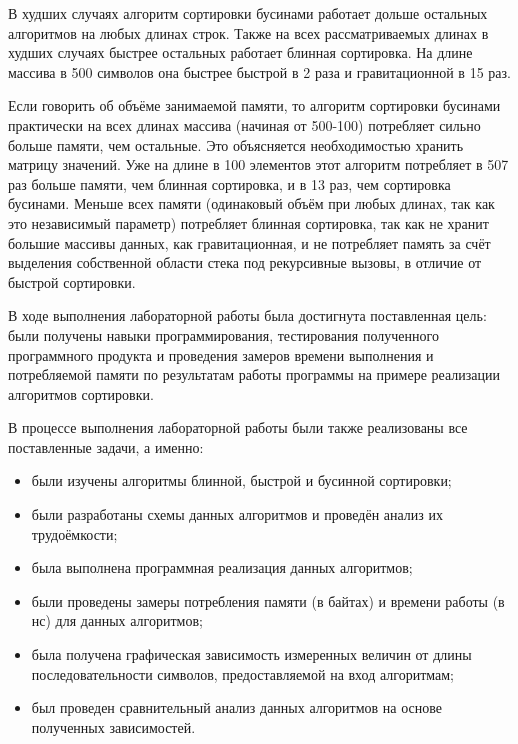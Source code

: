 В худших случаях алгоритм сортировки бусинами работает дольше остальных алгоритмов на любых длинах строк. Также на всех рассматриваемых длинах в худших случаях быстрее остальных работает блинная сортировка. На длине массива в 500 символов она быстрее быстрой в 2 раза и гравитационной в 15 раз.

Если говорить об объёме занимаемой памяти, то алгоритм сортировки бусинами практически на всех длинах массива (начиная от 500-100) потребляет сильно больше памяти, чем остальные. Это объясняется необходимостью хранить матрицу значений. Уже на длине в 100 элементов этот алгоритм потребляет в 507 раз больше памяти, чем блинная сортировка, и в 13 раз, чем сортировка бусинами. Меньше всех памяти (одинаковый объём при любых длинах, так как это независимый параметр) потребляет блинная сортировка, так как не хранит большие массивы данных, как гравитационная, и не потребляет память за счёт выделения собственной области стека под рекурсивные вызовы, в отличие от быстрой сортировки.

В ходе выполнения лабораторной работы была достигнута поставленная цель: были получены навыки программирования, тестирования полученного программного продукта и проведения замеров времени выполнения и потребляемой памяти по результатам работы программы на примере реализации алгоритмов сортировки.

В процессе выполнения лабораторной работы были также реализованы все поставленные задачи, а именно:
\begin{itemize}
	\item были изучены алгоритмы блинной, быстрой и бусинной сортировки;
	\item были разработаны схемы данных алгоритмов и проведён анализ их трудоёмкости;
	\item была выполнена программная реализация данных алгоритмов;
	\item были проведены замеры потребления памяти (в байтах) и времени работы (в нс) для данных алгоритмов;
	\item была получена графическая зависимость измеренных величин от длины последовательности символов, предоставляемой на вход алгоритмам;
	\item был проведен сравнительный анализ данных алгоритмов на основе полученных зависимостей.
\end{itemize}

\newpage